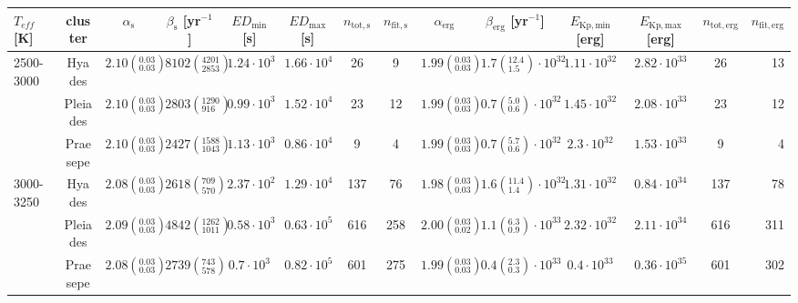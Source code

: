 \begin{tabular}{lccccccccccccr}
\hline
 $T_{eff}$ [K] & cluster &            $\alpha_\mathrm{s}$ &     $\beta_\mathrm{s}$ [yr$^{-1}$] & $ED_\mathrm{min}$ [s] & $ED_\mathrm{max}$ [s] & $n_\mathrm{tot,s}$ & $n_\mathrm{fit,s}$ &              $\alpha_\mathrm{erg}$ &              $\beta_\mathrm{erg}$ [yr$^{-1}$] & $E_\mathrm{Kp,min}$ [erg] & $E_\mathrm{Kp,max}$ [erg] & $n_\mathrm{tot,erg}$ & $n_\mathrm{fit,erg}$ \\
\hline
2500-3000 & Hyades &  $2.10\left(^{0.03}_{0.03}\right)$ &  $8102\left(^{4201}_{2853}\right)$ &    $1.24\cdot 10^{3}$ &    $1.66\cdot 10^{4}$ &                 26 &                  9 &  $1.99\left(^{0.03}_{0.03}\right)$ &  $1.7\left(^{12.4}_{1.5}\right)\cdot 10^{32}$ &       $1.11\cdot 10^{32}$ &       $2.82\cdot 10^{33}$ &                   26 &                   13 \\
          & Pleiades &  $2.10\left(^{0.03}_{0.03}\right)$ &   $2803\left(^{1290}_{916}\right)$ &    $0.99\cdot 10^{3}$ &    $1.52\cdot 10^{4}$ &                 23 &                 12 &  $1.99\left(^{0.03}_{0.03}\right)$ &   $0.7\left(^{5.0}_{0.6}\right)\cdot 10^{32}$ &       $1.45\cdot 10^{32}$ &       $2.08\cdot 10^{33}$ &                   23 &                   12 \\
          & Praesepe &  $2.10\left(^{0.03}_{0.03}\right)$ &  $2427\left(^{1588}_{1043}\right)$ &    $1.13\cdot 10^{3}$ &    $0.86\cdot 10^{4}$ &                  9 &                  4 &  $1.99\left(^{0.03}_{0.03}\right)$ &   $0.7\left(^{5.7}_{0.6}\right)\cdot 10^{32}$ &        $2.3\cdot 10^{32}$ &       $1.53\cdot 10^{33}$ &                    9 &                    4 \\
3000-3250 & Hyades &  $2.08\left(^{0.03}_{0.03}\right)$ &    $2618\left(^{709}_{570}\right)$ &    $2.37\cdot 10^{2}$ &    $1.29\cdot 10^{4}$ &                137 &                 76 &  $1.98\left(^{0.03}_{0.03}\right)$ &  $1.6\left(^{11.4}_{1.4}\right)\cdot 10^{32}$ &       $1.31\cdot 10^{32}$ &       $0.84\cdot 10^{34}$ &                  137 &                   78 \\
          & Pleiades &  $2.09\left(^{0.03}_{0.03}\right)$ &  $4842\left(^{1262}_{1011}\right)$ &    $0.58\cdot 10^{3}$ &    $0.63\cdot 10^{5}$ &                616 &                258 &  $2.00\left(^{0.03}_{0.02}\right)$ &   $1.1\left(^{6.3}_{0.9}\right)\cdot 10^{33}$ &       $2.32\cdot 10^{32}$ &       $2.11\cdot 10^{34}$ &                  616 &                  311 \\
          & Praesepe &  $2.08\left(^{0.03}_{0.03}\right)$ &    $2739\left(^{743}_{578}\right)$ &     $0.7\cdot 10^{3}$ &    $0.82\cdot 10^{5}$ &                601 &                275 &  $1.99\left(^{0.03}_{0.03}\right)$ &   $0.4\left(^{2.3}_{0.3}\right)\cdot 10^{33}$ &        $0.4\cdot 10^{33}$ &       $0.36\cdot 10^{35}$ &                  601 &                  302 \\

\end{tabular}
